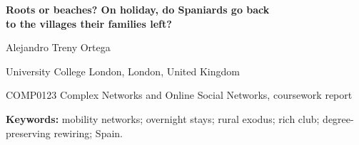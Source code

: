 \documentclass[11pt]{article}
\begin{document}
\begin{center}
{\LARGE\bfseries Roots or beaches? On holiday, do Spaniards go back\\[2pt] to the villages their families left?\par}
\vspace{12pt}
{\large Alejandro Treny Ortega\par}
\smallskip
University College London, London, United Kingdom\par
\smallskip
{\small COMP0123 Complex Networks and Online Social Networks, coursework report\par}
\end{center}

\begin{abstract}

\end{abstract}

\noindent\textbf{Keywords:} mobility networks; overnight stays; rural exodus; rich club; degree-preserving rewiring; Spain.

\clearpage














\end{document}
